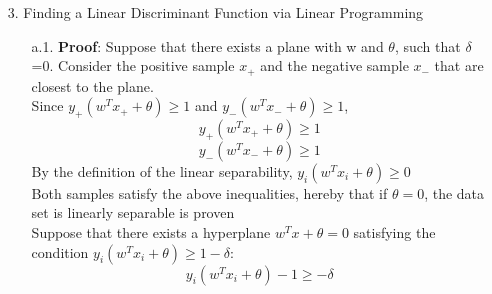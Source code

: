 \begin{enumerate}
\begin{enumerate}
	\item[2.]Linear Algebra Review
	\end{enumerate}
	\begin{enumerate}
		\item[a.]\textbf Suppose there is a point \(x_0\) on the hyperplane such that the \(\|x_0-x_1\|^2\) is minimized, which means either \(x_0=x_1\) or that the vector \((x_0-x_1)\) is perpendicular to the hyperplane:
		\[x_0-x_1=\lambda w\]
		\[\|x_0-x_1\|=\lambda \|w\|\]
		where \(\lambda\) is a constant.\\
		Since \(x_1\) is on the hyperplane:
		\[w^Tx_1+\theta=0\]
		and
		\[x_1=x_0-\lambda w\]
		so
		\[w^T(x_0-\lambda w )+\theta=0\]
		\[\|w^Tx_0+\theta\|=\lambda \|w^Tw\|\]
		Combining the above equations we have:
		\[d=\|x_0-x_1\|=\lambda\|w\|=\frac{\|w^Tx_0+\theta\|}{\|w\|}\]
		\item[b.]\textbf First of all, the two hyperplanes are parallel, because of they share the same \(w\) and since they are parallel, distance between any point of one plane and the other plane is also the distance between the two planes.\\
		Picking random point \(x_0\) on plane \(w^Tx+\theta _1=0\), we have:
		\[w^Tx_0+\theta _1=0\]
		i.e.
		\[w^Tx_0=-\theta _1\]
		 Applying the analytical solution to distance between \(x_0\) and plane \(w^Tx+\theta _2=0\):
		\[d=\frac{\|w^Tx_0+\theta _2\|}{\|w\|}\]
		Substituting the \(w^Tx_0\) with \(-\theta _1\):
		\[d=\frac{\|\theta _2-\theta _1\|}{\|w\|}\]
	\end{enumerate}
	\item[3.]Finding a Linear Discriminant Function via Linear Programming 
	\begin{enumerate}
		\item[a.1.]\textbf{Proof}: Suppose that there exists a plane with w and \(\theta\), such that \(\delta\)=0. Consider the positive sample \(x_+\) and the negative sample \(x_-\) that are closest to the plane.\\
		Since \(y_+(w^Tx_++\theta)\geq 1\) and  \(y_-(w^Tx_-+\theta)\geq 1\),
		\[y_+(w^Tx_++\theta)\geq 1\]
		\[y_-(w^Tx_-+\theta)\geq 1\]
		By the definition of the linear separability, \(y_i(w^Tx_i+\theta)\geq  0\)\\
		Both samples satisfy the above inequalities, hereby that if \(\theta=0\), the data set is linearly separable is proven\\
		Suppose that there exists a hyperplane \(w^Tx+\theta=0\) satisfying the condition \(y_i(w^Tx_i+\theta)\geq 1-\delta \):
		 \[y_i(w^Tx_i+\theta)-1\geq-\delta \]\\

\end{enumerate}
\end{enumerate}
